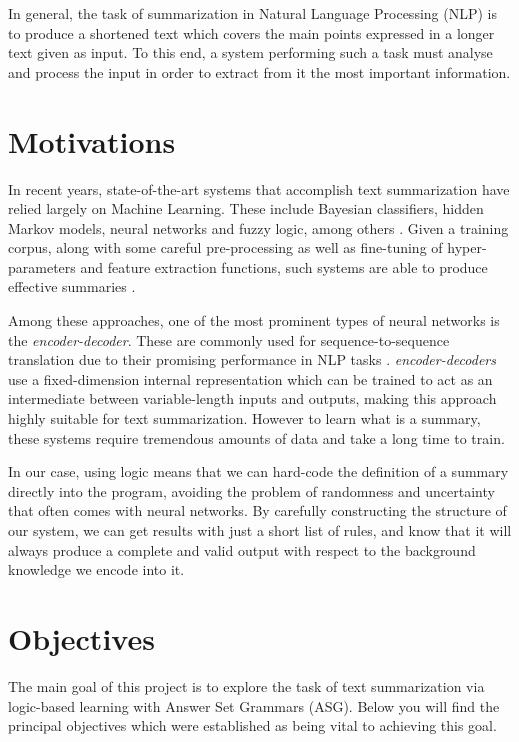 \label{chapter:introduction}

In general, the task of summarization in Natural Language Processing (NLP) is to produce a shortened text which covers the main points expressed in a longer text given as input. To this end, a system performing such a task must analyse and process the input in order to extract from it the most important information.

\section{Motivations}

In recent years, state-of-the-art systems that accomplish text summarization have relied largely on Machine Learning. These include Bayesian classifiers, hidden Markov models, neural networks and fuzzy logic, among others \cite{kiyani_survey_2017}. Given a training corpus, along with some careful pre-processing as well as fine-tuning of hyper-parameters and feature extraction functions, such systems are able to produce effective summaries \cite{kiyani_survey_2017}.

Among these approaches, one of the most prominent types of neural networks is the \textit{encoder-decoder}. These are commonly used for sequence-to-sequence translation due to their promising performance in NLP tasks \cite{yao_dual_2018}. \textit{encoder-decoders} use a fixed-dimension internal representation which can be trained to act as an intermediate between variable-length inputs and outputs, making this approach highly suitable for text summarization. However to learn what is a summary, these systems require tremendous amounts of data and take a long time to train.

In our case, using logic means that we can hard-code the definition of a summary directly into the program, avoiding the problem of randomness and uncertainty that often comes with neural networks. By carefully constructing the structure of our system, we can get results with just a short list of rules, and know that it will always produce a complete and valid output with respect to the background knowledge we encode into it.

\section{Objectives}

The main goal of this project is to explore the task of text summarization via logic-based learning with Answer Set Grammars (ASG). Below you will find the principal objectives which were established as being vital to achieving this goal.

